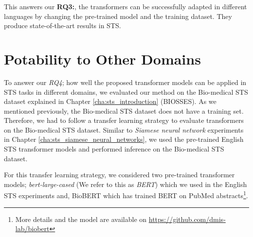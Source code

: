 This answers our \textbf{RQ3:}, the transformers can be successfully adapted in different languages by changing the pre-trained model and the training dataset. They produce state-of-the-art results in STS.

\section{Potability to Other Domains}
\label{sec:transformer_domain}
To answer our \textit{RQ4}; how well the proposed transformer models can be applied in STS tasks in different domains, we evaluated our method on the Bio-medical STS dataset explained in Chapter \ref{cha:sts_introduction} (BIOSSES). As we mentioned previously, the Bio-medical STS dataset does not have a training set. Therefore, we had to follow a transfer learning strategy to evaluate transformers on the Bio-medical STS dataset. Similar to \textit{Siamese neural network} experiments in Chapter \ref{cha:sts_siamese_neural_networks}, we used the pre-trained English STS transformer models and performed inference on the Bio-medical STS dataset. 

For this transfer learning strategy, we considered two pre-trained transformer models; \textit{bert-large-cased} \autocite{devlin-etal-2019-bert} (We refer to this as \textit{BERT}) which we used in the English STS experiments and, BioBERT \autocite{10.1093/bioinformatics/btz682} which has trained BERT on PubMed abstracts\footnote{More details and the model are available on \url{https://github.com/dmis-lab/biobert}}.

\begin{table}[htb]
	\centering
	\caption[Results for transfer learning with transformers in the BIOSSES dataset]{Results for transfer learning with transformers in the BIOSSES dataset. Two considered pre-trained transformer models are textbf{BERT} and \textbf{BioBERT}. For ease of visualisation we only report the Pearson correlation ($\bm{\rho}$).}  
	\label{tab:transfer_transformers_biosses}
\end{table}


